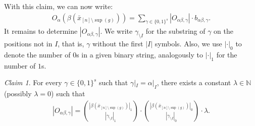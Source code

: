 \documentclass[11pt]{article}
\DeclareMathOperator{\supp}{sup}
\newcommand{\bbN}{\mathbb{N}}
\theoremstyle{definition}
\theoremstyle{plain}
\theoremstyle{remark}
\newtheorem{claim}{Claim}[lemma]
\theoremstyle{remark}
\begin{document}
With this claim, we can now write:
\begin{align}
	O_\alpha(\beta(\bar{x}_{[n] \setminus \supp(g)})) = \sum_{\gamma \in \{0,1\}^{s}} |O_{\alpha\beta, \gamma}| \cdot b_{\alpha\beta, \gamma}. \label{eq:sumOverAllGamma}
\end{align}
It remains to determine $|O_{\alpha\beta, \gamma}|$. We write $\gamma_{\setminus I}$ for the substring of $\gamma$ on the positions not in $I$, that is, $\gamma$ without the first $|I|$ symbols. Also, we use $| \cdot |_0$ to denote the number of $0$s in a given binary string, analogously to $| \cdot |_1$ for the number of $1$s.

\begin{claim}
	\label{claim:sizeOfGroupedSets}	
	For every $\gamma \in \{0,1\}^{s}$ such that $\gamma|_I = \alpha|_I$, there exists a constant $\lambda \in \bbN$ (possibly $\lambda = 0$) such that
	\begin{align*}
		|O_{\alpha\beta, \gamma}| = 
		\binom{|\beta(\bar{x}_{[n] \setminus \supp(g)})|_1 }{|\gamma_{\setminus I}|_1} \cdot \binom{|\beta(\bar{x}_{[n] \setminus \supp(g)})|_0 }{|\gamma_{\setminus I}|_0} \cdot \lambda.
	\end{align*}
\end{claim}
\end{document}
